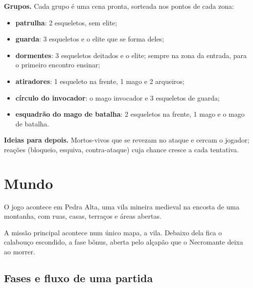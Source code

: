 \documentclass[11pt,a4paper]{article}
\begin{document}
\textbf{Grupos.} Cada grupo é uma cena pronta, sorteada nos pontos de cada zona:
\begin{itemize}
    \item \textbf{patrulha}: 2 esqueletos, sem elite;
    \item \textbf{guarda}: 3 esqueletos e o elite que se forma deles;
    \item \textbf{dormentes}: 3 esqueletos deitados e o elite; sempre na zona da entrada, para o primeiro encontro ensinar;
    \item \textbf{atiradores}: 1 esqueleto na frente, 1 mago e 2 arqueiros;
    \item \textbf{círculo do invocador}: o mago invocador e 3 esqueletos de guarda;
    \item \textbf{esquadrão do mago de batalha}: 2 esqueletos na frente, 1 mago e o mago de batalha.
\end{itemize}

\textbf{Ideias para depois.} Mortos-vivos que se revezam no ataque e cercam o jogador; reações (bloqueio, esquiva, contra-ataque) cuja chance cresce a cada tentativa.

\section{Mundo}

O jogo acontece em Pedra Alta, uma vila mineira medieval na encosta de uma montanha, com ruas, casas, terraços e áreas abertas.

A missão principal acontece num único mapa, a vila. Debaixo dela fica o calabouço escondido, a fase bônus, aberta pelo alçapão que o Necromante deixa ao morrer.

\subsection{Fases e fluxo de uma partida}
\label{sec:fases}
\end{document}
